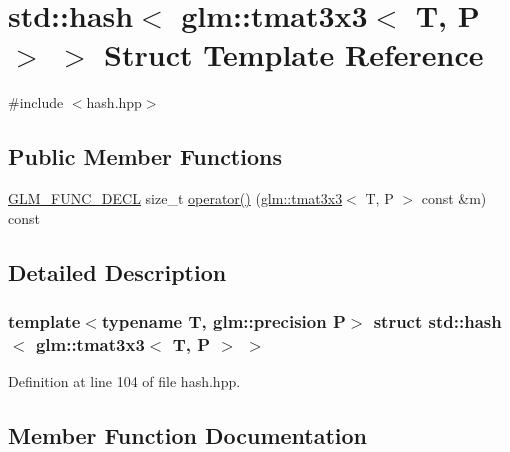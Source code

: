 \hypertarget{structstd_1_1hash_3_01glm_1_1tmat3x3_3_01_t_00_01_p_01_4_01_4}{}\section{std\+::hash$<$ glm\+::tmat3x3$<$ T, P $>$ $>$ Struct Template Reference}
\label{structstd_1_1hash_3_01glm_1_1tmat3x3_3_01_t_00_01_p_01_4_01_4}


{\ttfamily \#include $<$hash.\+hpp$>$}

\subsection*{Public Member Functions}
\begin{DoxyCompactItemize}
\item 
\mbox{\hyperlink{setup_8hpp_ab2d052de21a70539923e9bcbf6e83a51}{G\+L\+M\+\_\+\+F\+U\+N\+C\+\_\+\+D\+E\+CL}} size\+\_\+t \mbox{\hyperlink{structstd_1_1hash_3_01glm_1_1tmat3x3_3_01_t_00_01_p_01_4_01_4_a035e1905aa65d5416ea5010b33dcd5a9}{operator()}} (\mbox{\hyperlink{structglm_1_1tmat3x3}{glm\+::tmat3x3}}$<$ T, P $>$ const \&m) const
\end{DoxyCompactItemize}


\subsection{Detailed Description}
\subsubsection*{template$<$typename T, glm\+::precision P$>$\newline
struct std\+::hash$<$ glm\+::tmat3x3$<$ T, P $>$ $>$}



Definition at line 104 of file hash.\+hpp.



\subsection{Member Function Documentation}
\mbox{\label{structstd_1_1hash_3_01glm_1_1tmat3x3_3_01_t_00_01_p_01_4_01_4_a035e1905aa65d5416ea5010b33dcd5a9}} 
